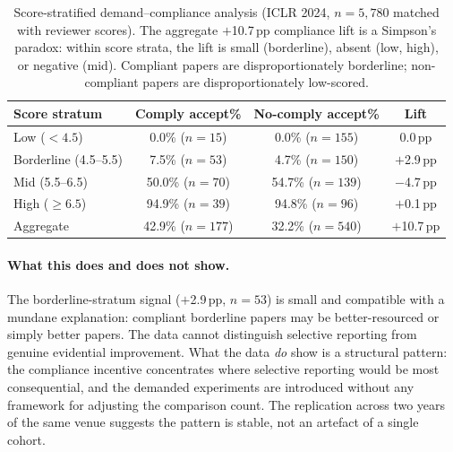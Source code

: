 \documentclass{article}
\begin{document}
\begin{table}[t]
\centering
\caption{Score-stratified demand--compliance analysis (ICLR 2024, $n = 5{,}780$ matched with reviewer scores). The aggregate $+$10.7\,pp compliance lift is a Simpson's paradox: within score strata, the lift is small (borderline), absent (low, high), or negative (mid). Compliant papers are disproportionately borderline; non-compliant papers are disproportionately low-scored.}
\label{tab:stratified}
\small
\begin{tabular}{@{}lccc@{}}
\toprule
Score stratum & Comply accept\% & No-comply accept\% & Lift \\
\midrule
Low ($< 4.5$) & 0.0\% ($n = 15$) & 0.0\% ($n = 155$) & 0.0\,pp \\
Borderline (4.5--5.5) & 7.5\% ($n = 53$) & 4.7\% ($n = 150$) & $+$2.9\,pp \\
Mid (5.5--6.5) & 50.0\% ($n = 70$) & 54.7\% ($n = 139$) & $-$4.7\,pp \\
High ($\geq 6.5$) & 94.9\% ($n = 39$) & 94.8\% ($n = 96$) & $+$0.1\,pp \\
\midrule
Aggregate & 42.9\% ($n = 177$) & 32.2\% ($n = 540$) & $+$10.7\,pp \\
\bottomrule
\end{tabular}
\end{table}

\paragraph{What this does and does not show.} The borderline-stratum signal ($+$2.9\,pp, $n = 53$) is small and compatible with a mundane explanation: compliant borderline papers may be better-resourced or simply better papers. The data cannot distinguish selective reporting from genuine evidential improvement. What the data \textit{do} show is a structural pattern: the compliance incentive concentrates where selective reporting would be most consequential, and the demanded experiments are introduced without any framework for adjusting the comparison count. The replication across two years of the same venue suggests the pattern is stable, not an artefact of a single cohort.
\end{document}
